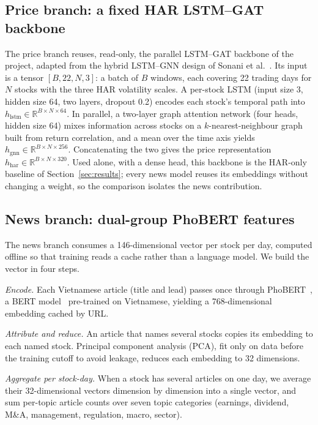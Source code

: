 \documentclass[runningheads]{llncs}
\begin{document}
\subsection{Price branch: a fixed HAR LSTM--GAT backbone}
The price branch reuses, read-only, the parallel LSTM--GAT backbone of the project, adapted from the
hybrid LSTM--GNN design of Sonani et al.~\cite{sonani2025}. Its input is a tensor
$[B,22,N,3]$: a batch of $B$ windows, each covering 22 trading days for $N$ stocks with the three
HAR volatility scales. A per-stock LSTM (input size 3, hidden size 64, two layers, dropout 0.2)
encodes each stock's temporal path into $h_{\text{lstm}}\in\mathbb{R}^{B\times N\times 64}$. In
parallel, a two-layer graph attention network (four heads, hidden size 64) mixes information across
stocks on a $k$-nearest-neighbour graph built from return correlation, and a mean over the time
axis yields $h_{\text{gnn}}\in\mathbb{R}^{B\times N\times 256}$. Concatenating the two gives the
price representation $h_{\text{har}}\in\mathbb{R}^{B\times N\times 320}$. Used alone, with a dense
head, this backbone is the HAR-only baseline of Section~\ref{sec:results}; every news model reuses
its embeddings without changing a weight, so the comparison isolates the news contribution.

\subsection{News branch: dual-group PhoBERT features}
\label{sec:news}
The news branch consumes a 146-dimensional vector per stock per day, computed offline so that
training reads a cache rather than a language model. We build the vector in four steps.

\emph{Encode.} Each Vietnamese article (title and lead) passes once through
PhoBERT~\cite{phobert2020}, a BERT model~\cite{devlin2019} pre-trained on Vietnamese, yielding a
768-dimensional embedding cached by URL.

\emph{Attribute and reduce.} An article that names several stocks copies its embedding to each named
stock. Principal component analysis (PCA), fit only on data before the training cutoff to avoid
leakage, reduces each embedding to 32 dimensions.

\emph{Aggregate per stock-day.} When a stock has several articles on one day, we average their
32-dimensional vectors dimension by dimension into a single vector, and sum per-topic article counts
over seven topic categories (earnings, dividend, M\&A, management, regulation, macro, sector).
\end{document}
